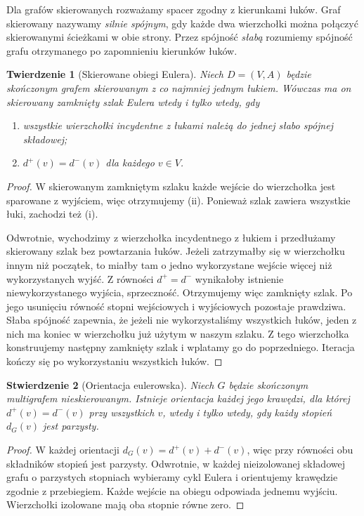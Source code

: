 \documentclass[11pt,a4paper]{report}
\numberwithin{equation}{section}
\theoremstyle{plain}
\newtheorem{twierdzenie}{Twierdzenie}[section]
\newtheorem{stwierdzenie}[twierdzenie]{Stwierdzenie}
\theoremstyle{definition}
\theoremstyle{remark}
\begin{document}
Dla grafów skierowanych rozważamy spacer zgodny z kierunkami
łuków. Graf skierowany nazywamy \emph{silnie spójnym}, gdy
każde dwa wierzchołki można połączyć skierowanymi ścieżkami
w obie strony. Przez spójność \emph{słabą} rozumiemy spójność
grafu otrzymanego po zapomnieniu kierunków łuków.

\begin{twierdzenie}[Skierowane obiegi Eulera]
Niech $D=(V,A)$ będzie skończonym grafem skierowanym
z co najmniej jednym łukiem. Wówczas ma on skierowany
zamknięty szlak Eulera wtedy i tylko wtedy, gdy
\begin{enumerate}[label=(\roman*)]
\item wszystkie wierzchołki incydentne z łukami należą do
jednej słabo spójnej składowej;
\item $d^+(v)=d^-(v)$ dla każdego $v\in V$.
\end{enumerate}
\end{twierdzenie}

\begin{proof}
W skierowanym zamkniętym szlaku każde wejście do wierzchołka
jest sparowane z wyjściem, więc otrzymujemy (ii).
Ponieważ szlak zawiera wszystkie łuki, zachodzi też (i).

Odwrotnie, wychodzimy z wierzchołka incydentnego z łukiem
i przedłużamy skierowany szlak bez powtarzania łuków.
Jeżeli zatrzymałby się w wierzchołku innym niż początek,
to miałby tam o jedno wykorzystane wejście więcej niż
wykorzystanych wyjść. Z równości $d^+=d^-$ wynikałoby
istnienie niewykorzystanego wyjścia, sprzeczność.
Otrzymujemy więc zamknięty szlak. Po jego usunięciu
równość stopni wejściowych i wyjściowych pozostaje prawdziwa.
Słaba spójność zapewnia, że jeżeli nie wykorzystaliśmy
wszystkich łuków, jeden z nich ma koniec w wierzchołku
już użytym w naszym szlaku. Z tego wierzchołka konstruujemy
następny zamknięty szlak i wplatamy go do poprzedniego.
Iteracja kończy się po wykorzystaniu wszystkich łuków.
\end{proof}

\begin{stwierdzenie}[Orientacja eulerowska]
Niech $G$ będzie skończonym multigrafem nieskierowanym.
Istnieje orientacja każdej jego krawędzi, dla której
$d^+(v)=d^-(v)$ przy wszystkich $v$, wtedy i tylko wtedy,
gdy każdy stopień $d_G(v)$ jest parzysty.
\end{stwierdzenie}

\begin{proof}
W każdej orientacji $d_G(v)=d^+(v)+d^-(v)$,
więc przy równości obu składników stopień jest parzysty.
Odwrotnie, w każdej nieizolowanej składowej grafu o
parzystych stopniach wybieramy cykl Eulera i orientujemy
krawędzie zgodnie z przebiegiem. Każde wejście na obiegu
odpowiada jednemu wyjściu. Wierzchołki izolowane mają
oba stopnie równe zero.
\end{proof}
\end{document}
